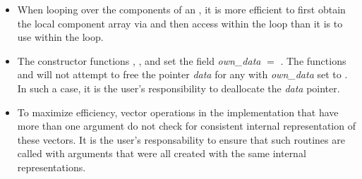 \begin{itemize}
                                        
\item
  When looping over the components of an  , it is     
  more efficient to first obtain the local component array via       
   and then access  within the     
  loop than it is to use  within the loop.        
                                                               
\item
  {\warn} The {\nvecp} constructor functions , , 
  and 
  set the field {\em own\_data} $=$ . 
  The functions  and 
  will not attempt to free the pointer {\em data} for any  with
  {\em own\_data} set to . In such a case, it is the user's responsibility to
  deallocate the {\em data} pointer.

\item
  {\warn} To maximize efficiency, vector operations in the {\nvecp} implementation
  that have more than one  argument do not check for
  consistent internal representation of these vectors. It is the user's 
  responsability to ensure that such routines are called with 
  arguments that were all created with the same internal representations.

\end{itemize}

